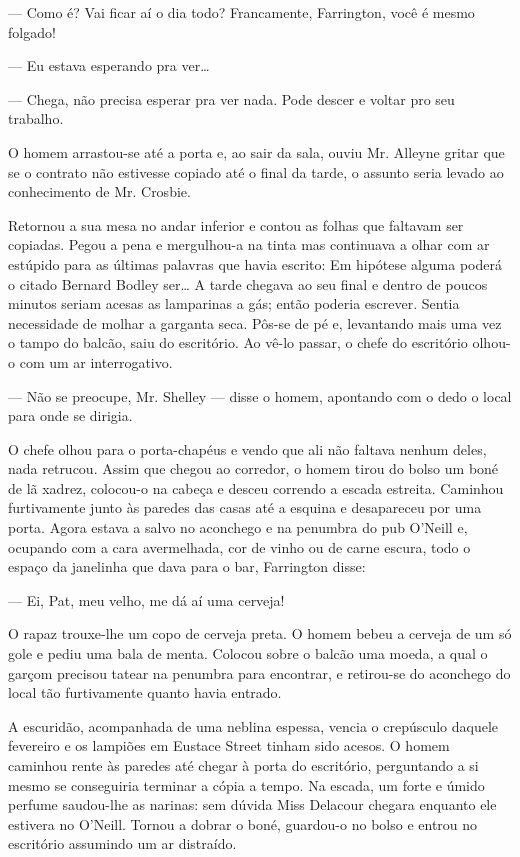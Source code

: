 --- Como é? Vai ficar aí o dia todo? Francamente, Farrington, você é
mesmo folgado!

--- Eu estava esperando pra ver\ldots{}

--- Chega, não precisa esperar pra ver nada. Pode descer e voltar
pro seu trabalho.

O homem arrastou-se até a porta e, ao sair da sala, ouviu Mr. Alleyne
gritar que se o contrato não estivesse copiado até o final da tarde, o
assunto seria levado ao conhecimento de Mr. Crosbie.

Retornou a sua mesa no andar inferior e contou as folhas que faltavam
ser copiadas. Pegou a pena e mergulhou-a na tinta mas continuava a
olhar com ar estúpido para as últimas palavras que havia escrito: Em
hipótese alguma poderá o citado Bernard Bodley ser\ldots{} A tarde chegava
ao seu final e dentro de poucos minutos seriam acesas as lamparinas a
gás; então poderia escrever. Sentia necessidade de molhar a garganta
seca. Pôs-se de pé e, levantando mais uma vez o tampo do balcão, saiu
do escritório. Ao vê-lo passar, o chefe do escritório olhou-o com um
ar interrogativo.

--- Não se preocupe, Mr. Shelley --- disse o homem, apontando com o
dedo o local para onde se dirigia.

O chefe olhou para o porta-chapéus e vendo que ali não faltava nenhum
deles, nada retrucou. Assim que chegou ao corredor, o homem tirou do
bolso um boné de lã xadrez, colocou-o na cabeça e desceu correndo a
escada estreita. Caminhou furtivamente junto às paredes das casas até a
esquina e desapareceu por uma porta. Agora estava a salvo no aconchego
e na penumbra do pub O'Neill e, ocupando com a cara avermelhada, cor
de vinho ou de carne escura, todo o espaço da janelinha que dava para
o bar, Farrington disse:

--- Ei, Pat, meu velho, me dá aí uma cerveja!

O rapaz trouxe-lhe um copo de cerveja preta. O homem bebeu
a cerveja de um só gole e pediu uma bala de menta. Colocou sobre
o balcão uma moeda, a qual o garçom precisou tatear na penumbra para
encontrar, e retirou-se do aconchego do local tão furtivamente
quanto havia entrado.

A escuridão, acompanhada de uma neblina espessa, vencia o crepúsculo
daquele fevereiro e os lampiões em Eustace Street tinham sido acesos.
O homem caminhou rente às paredes até chegar à porta do escritório,
perguntando a si mesmo se conseguiria terminar a cópia a tempo. Na
escada, um forte e úmido perfume saudou-lhe as narinas: sem dúvida
Miss Delacour chegara enquanto ele estivera no O'Neill. Tornou a dobrar o boné,
guardou-o no bolso e entrou no escritório assumindo um ar distraído.

